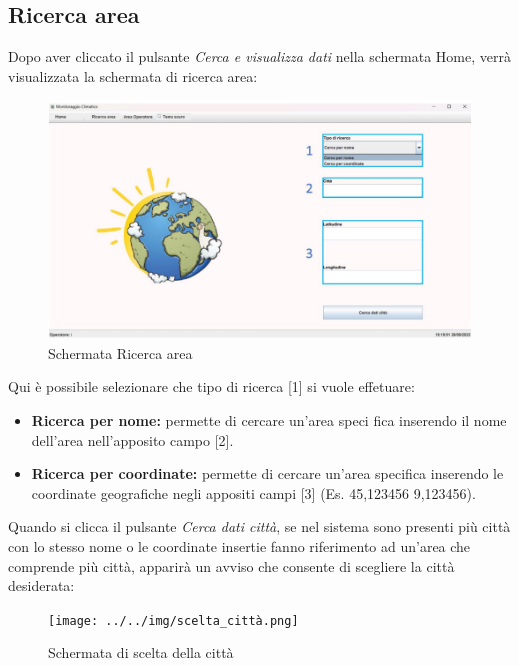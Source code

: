 \subsection{Ricerca area}
Dopo aver cliccato il pulsante \emph{Cerca e visualizza dati} nella schermata Home, verrà visualizzata la schermata di ricerca area:
\begin{figure}[H]
    \centering
    \includegraphics[width=1\textwidth]{../../img/schermata_ricerca_area.png}
    \caption{Schermata Ricerca area}
\end{figure}
Qui è possibile selezionare che tipo di ricerca [1] si vuole effetuare:
\begin{itemize}
    \item \textbf{Ricerca per nome:} permette di cercare un'area speci
    fica inserendo il nome dell'area nell'apposito campo [2].
    \item \textbf{Ricerca per coordinate:} permette di cercare un'area specifica inserendo le coordinate geografiche negli appositi campi [3]
    (Es. 45,123456  9,123456).
\end{itemize}

Quando si clicca il pulsante \emph{Cerca dati città}, se nel sistema sono presenti più città con lo stesso nome o le coordinate insertie fanno riferimento
ad un'area che comprende più città, apparirà un avviso che consente di scegliere la città desiderata: 
\begin{figure}[H]
    \centering
    \texttt{[image: ../../img/scelta\_città.png]}
    \caption{Schermata di scelta della città}
\end{figure} 